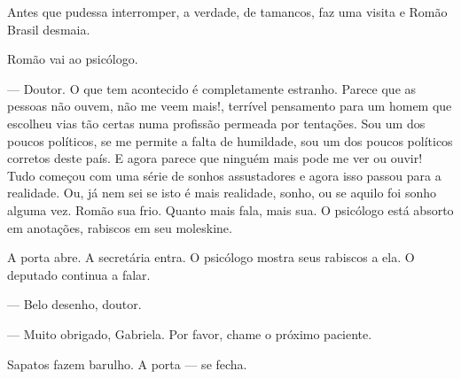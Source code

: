 Antes que pudessa interromper, a verdade, de tamancos, faz uma visita e Romão Brasil desmaia.



Romão vai ao psicólogo.

--- Doutor. O que tem acontecido é completamente estranho. Parece que as pessoas não ouvem, não me veem mais!, terrível pensamento para um homem que escolheu vias tão certas numa profissão permeada por tentações. Sou um dos poucos políticos, se me permite a falta de humildade, sou um dos poucos políticos corretos deste país. E agora parece que ninguém mais pode me ver ou ouvir! Tudo começou com uma série de sonhos assustadores e agora isso passou para a realidade. Ou, já nem sei se isto é mais realidade, sonho, ou se aquilo foi sonho alguma vez. Romão sua frio. Quanto mais fala, mais sua. O psicólogo está absorto em anotações, rabiscos em seu moleskine.

A porta abre. A secretária entra. O psicólogo mostra seus rabiscos a ela. O deputado continua a falar.

--- Belo desenho, doutor.

--- Muito obrigado, Gabriela. Por favor, chame o próximo paciente.

Sapatos fazem barulho. A porta --- se fecha.
